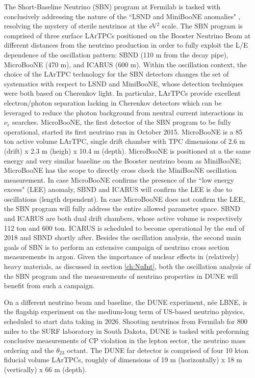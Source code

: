 The Short-Baseline Neutrino (SBN) \cite{Antonello:2015lea} program at Fermilab  is tasked with conclusively addressing the nature of the ``LSND and MiniBooNE anomalies" \cite{Aguilar:2001ty, Athanassopoulos:1997pv, Aguilar-Arevalo:2013pmq}, resolving the mystery of  sterile neutrinos at the eV$^2$ scale.  The SBN program is comprised of three surface LArTPCs positioned on the Booster Neutrino Beam at different distances from the neutrino production in order to fully exploit  the L/E dependence of the oscillation pattern:  SBND (110 m from the decay pipe), MicroBooNE (470 m), and ICARUS (600 m). 
Within the oscillation context, the choice of the LArTPC technology for the SBN detectors changes the set of systematics with respect to LSND and MiniBooNE, whose detection techniques were both based on Cherenkov light.  In particular, LArTPCs provide excellent electron/photon separation \cite{Acciarri:2016sli} lacking in Cherenkov detectors which can be leveraged to reduce the photon background from neutral current interactions  in $\nu_e$ searches.
MicroBooNE\cite{MicroBooNE-det}, the first detector of the SBN program to be fully operational, started its first neutrino run in October 2015. MicroBooNE is a 85 ton active volume LArTPC, single drift chamber with TPC dimensions of 2.6 m (drift) x 2.3 m (heigh) x 10.4 m (depth). MicroBooNE is positioned at a the same energy and very similar baseline on the Booster neutrino beam as MiniBooNE; MicroBooNE has the scope to directly cross check the MiniBooNE oscillation measurement. 
In case MicroBooNE confirms the presence of the ``low energy excess" (LEE) anomaly, SBND and ICARUS will confirm the LEE is due to oscillations (length dependent).  In case MicroBooNE does not confirm the LEE, the SBN program will fully address the entire allowed parameter space.
SBND and ICARUS are both dual drift chambers, whose active volume is respectively 112 ton and 600 ton. ICARUS is scheduled to become operational by the end of 2018 and SBND shortly after. Besides the oscillation analysis, the second main goals of SBN is to perform an extensive campaign of neutrino cross section measurements in argon. Given the importance of nuclear effects in (relatively) heavy materials, as discussed in section \ref{ch:NuInt}, both the oscillation analysis of the SBN program and the measurements of neutrino properties in DUNE will benefit from such a campaign. 

On a different neutrino beam and baseline, the DUNE  experiment, n\'ee LBNE\cite{Adams:2013qkq},  is the flagship experiment on the medium-long term of US-based neutrino physics, scheduled to start data taking in 2026. Shooting neutrinos from Fermilab for 800 miles to the SURF laboratory in South Dakota, DUNE is tasked with preforming conclusive measurements of CP violation in the lepton sector,  the neutrino mass ordering and the $\theta_{23}$ octant. The DUNE far detector is comprised of four 10 kton fiducial volume LArTPCs, roughly of dimensions of  19 m (horizontally) x 18 m (vertically) x 66 m (depth).


